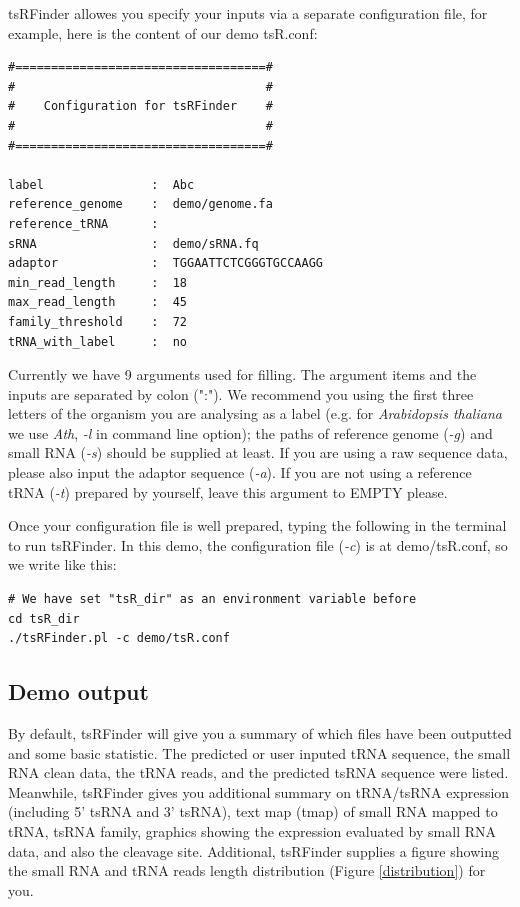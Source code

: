 \documentclass[11pt, a4paper]{article}
\begin{document}
tsRFinder allowes you specify your inputs via a separate configuration file, for example, here is the content of our demo tsR.conf:

\begin{verbatim}
#===================================#
#                                   #
#    Configuration for tsRFinder    #
#                                   #
#===================================#

label               :  Abc
reference_genome    :  demo/genome.fa 
reference_tRNA      :
sRNA                :  demo/sRNA.fq
adaptor             :  TGGAATTCTCGGGTGCCAAGG
min_read_length     :  18
max_read_length     :  45
family_threshold    :  72
tRNA_with_label     :  no
\end{verbatim}

Currently we have 9 arguments used for filling. The argument items and the inputs are separated by colon (":"). We recommend you using the first three letters of the organism you are analysing as a label (e.g. for \textit{Arabidopsis thaliana} we use \textit{Ath}, \emph{-l} in command line option); the paths of reference genome (\emph{-g}) and small RNA (\emph{-s}) should be supplied at least. If you are using a raw sequence data, please also input the adaptor sequence (\emph{-a}). If you are not using a reference tRNA (\emph{-t}) prepared by yourself, leave this argument to EMPTY please.

Once your configuration file is well prepared, typing the following in the terminal to run tsRFinder. In this demo, the configuration file (\emph{-c}) is at demo/tsR.conf, so we write like this:

\begin{verbatim}
# We have set "tsR_dir" as an environment variable before
cd tsR_dir
./tsRFinder.pl -c demo/tsR.conf
\end{verbatim}

\subsection{Demo output}

By default, tsRFinder will give you a summary of which files have been outputted and some basic statistic. The predicted or user inputed tRNA sequence, the small RNA clean data, the tRNA reads, and the predicted tsRNA sequence were listed. Meanwhile, tsRFinder gives you additional summary on tRNA/tsRNA expression (including 5' tsRNA and 3' tsRNA), text map (tmap) of small RNA mapped to tRNA, tsRNA family, graphics showing the expression evaluated by small RNA data, and also the cleavage site. Additional, tsRFinder supplies a figure showing the small RNA and tRNA reads length distribution (Figure \ref{distribution}) for you.
\end{document}
